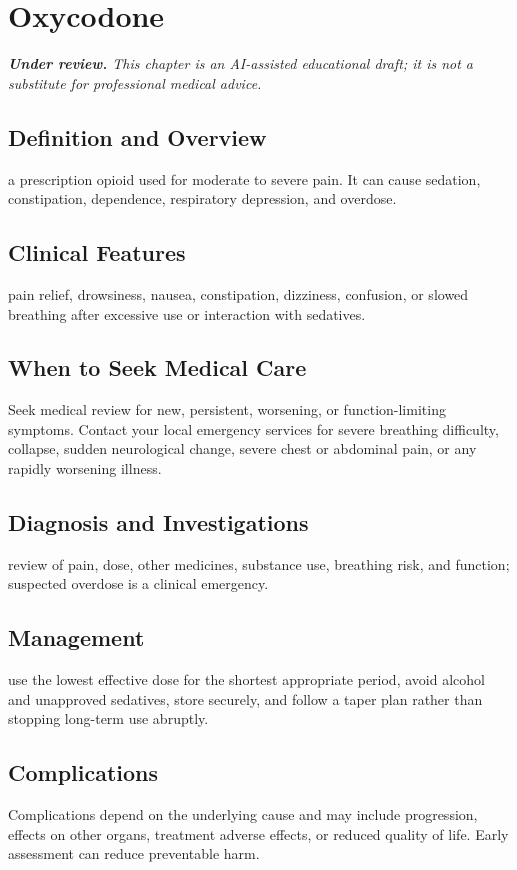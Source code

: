 \chapter{Oxycodone}

\medskip
\noindent\textit{\textbf{Under review.} This chapter is an AI-assisted educational draft; it is not a substitute for professional medical advice.}

\section*{Definition and Overview}
a prescription opioid used for moderate to severe pain. It can cause sedation, constipation, dependence, respiratory depression, and overdose.

\section*{Clinical Features}
pain relief, drowsiness, nausea, constipation, dizziness, confusion, or slowed breathing after excessive use or interaction with sedatives.

\section*{When to Seek Medical Care}
Seek medical review for new, persistent, worsening, or function-limiting symptoms. Contact your local emergency services for severe breathing difficulty, collapse, sudden neurological change, severe chest or abdominal pain, or any rapidly worsening illness.

\section*{Diagnosis and Investigations}
review of pain, dose, other medicines, substance use, breathing risk, and function; suspected overdose is a clinical emergency.

\section*{Management}
use the lowest effective dose for the shortest appropriate period, avoid alcohol and unapproved sedatives, store securely, and follow a taper plan rather than stopping long-term use abruptly.

\section*{Complications}
Complications depend on the underlying cause and may include progression, effects on other organs, treatment adverse effects, or reduced quality of life. Early assessment can reduce preventable harm.

